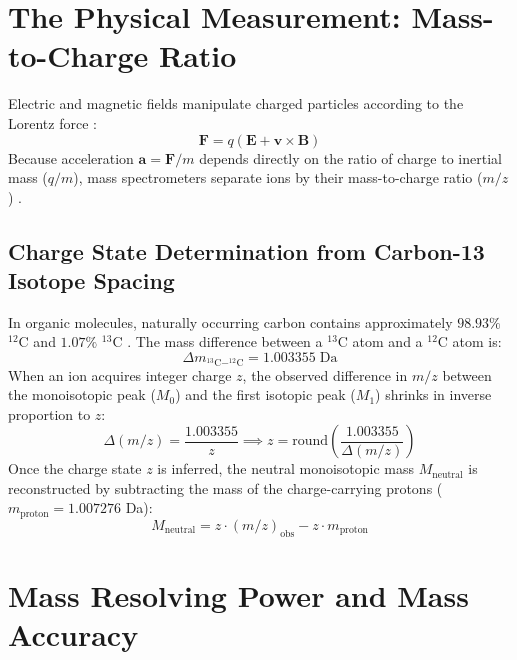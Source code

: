 \documentclass[11pt,twoside,openright]{book}
\begin{document}
\section{The Physical Measurement: Mass-to-Charge Ratio}
\label{sec:mz_measurement}

Electric and magnetic fields manipulate charged particles according to the Lorentz force \cite{gross2017mass, paul1990electromagnetic}:
\begin{equation}
\mathbf{F} = q(\mathbf{E} + \mathbf{v} \times \mathbf{B})
\end{equation}
Because acceleration $\mathbf{a} = \mathbf{F}/m$ depends directly on the ratio of charge to inertial mass ($q/m$), mass spectrometers separate ions by their mass-to-charge ratio ($m/z$) \cite{domon2006ms}.

\subsection{Charge State Determination from Carbon-13 Isotope Spacing}

In organic molecules, naturally occurring carbon contains approximately $98.93\%$ $^{12}\text{C}$ and $1.07\%$ $^{13}\text{C}$ \cite{gross2017mass}. The mass difference between a $^{13}\text{C}$ atom and a $^{12}\text{C}$ atom is:
\begin{equation}
\Delta m_{^{13}\text{C} - ^{12}\text{C}} = 1.003355\;\text{Da}
\end{equation}
When an ion acquires integer charge $z$, the observed difference in $m/z$ between the monoisotopic peak ($M_0$) and the first isotopic peak ($M_1$) shrinks in inverse proportion to $z$:
\begin{equation}
\Delta(m/z) = \frac{1.003355}{z} \implies z = \text{round}\left( \frac{1.003355}{\Delta(m/z)} \right)
\end{equation}
Once the charge state $z$ is inferred, the neutral monoisotopic mass $M_{\text{neutral}}$ is reconstructed by subtracting the mass of the charge-carrying protons ($m_{\text{proton}} = 1.007276$ Da):
\begin{equation}
M_{\text{neutral}} = z \cdot (m/z)_{\text{obs}} - z \cdot m_{\text{proton}}
\end{equation}

\section{Mass Resolving Power and Mass Accuracy}
\label{sec:resolving_power}
\end{document}
